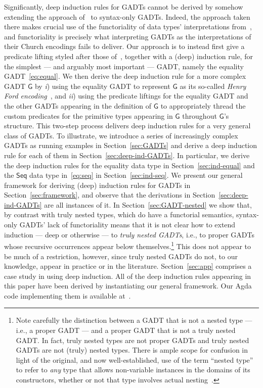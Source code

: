 \documentclass[9pt]{entcs}
\begin{document}
Significantly, deep induction rules for GADTs cannot be derived by
somehow extending the approach of~\cite{jp20} to syntax-only
GADTs. Indeed, the approach taken there makes crucial use of the
functoriality of data types' interpretations from~\cite{jp19}, and
functoriality is precisely what interpreting GADTs as the
interpretations of their Church encodings fails to deliver. Our
approach is to instead first give a predicate lifting styled after
those of~\cite{jp20}, together with a (deep) induction rule, for the
simplest --- and arguably most important --- GADT, namely the equality
GADT~\eqref{eq:equal}. We then derive the deep induction rule for a
more complex GADT $\mathsf{G}$ by {\em i}) using the equality GADT to
represent $\mathsf{G}$ as its so-called {\em Henry Ford
  encoding}~\cite{ch03,hin03,mcb99,sjsv09,sp04}, and {\em ii}) using
the predicate liftings for the equality GADT and the other GADTs
appearing in the definition of $\mathsf{G}$ to appropriately thread
the custom predicates for the primitive types appearing in
$\mathsf{G}$ throughout $\mathsf{G}$'s structure. This two-step
process delivers deep induction rules for a very general class of
GADTs. To illustrate, we introduce a series of increasingly complex
GADTs as running examples in Section~\ref{sec:GADTs} and derive a deep
induction rule for each of them in
Section~\ref{sec:deep-ind-GADTs}. In particular, we derive the deep
induction rules for the equality data type in
Section~\ref{sec:ind-equal} and the $\mathsf{Seq}$ data type
in~\eqref{eq:seq} in Section~\ref{sec:ind-seq}. We present our general
framework for deriving (deep) induction rules for GADTs in
Section~\ref{sec:framework}, and observe that the derivations in
Section~\ref{sec:deep-ind-GADTs} are all instances of it.  In
Section~\ref{sec:GADT-nested} we show that, by contrast with truly
nested types, which do have a functorial semantics, syntax-only GADTs'
lack of functoriality means that it is not clear how to extend
induction --- deep or otherwise --- to {\em truly nested GADTs}, i.e.,
to proper GADTs whose recursive occurrences appear below
themselves.\footnote{Note carefully the distinction between a GADT
  that is not a nested type --- i.e., a proper GADT --- and a proper
  GADT that is not a truly nested GADT.  In fact, truly nested types
  are not proper GADTs and truly nested GADTs are not (truly) nested
  types. There is ample scope for confusion in light of the original,
  and now well-established, use of the term ``nested type'' to refer
  to {\em any} type that allows non-variable instances in the domains
  of its constructors, whether or not that type involves actual
  nesting~\cite{bm98}.}  This does not appear to be much of a
restriction, however, since truly nested GADTs do not, to our
knowledge, appear in practice or in the
literature. Section~\ref{sec:app} comprises a case study in using deep
induction. All of the deep induction rules appearing in this paper
have been derived by instantiating our general framework. Our Agda
code implementing them is available at~\cite{web-page}.
\end{document}
